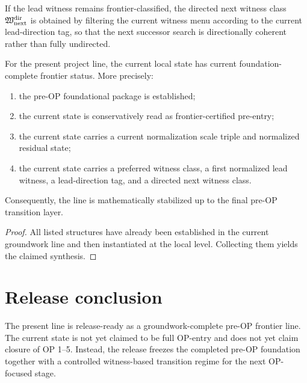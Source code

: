 \begin{definition}\label{def:directed-next-witness-class}
If the lead witness remains frontier-classified, the directed next witness class $\mathfrak{W}^{\mathrm{dir}}_{\mathrm{next}}$ is obtained by filtering the current witness menu according to the current lead-direction tag, so that the next successor search is directionally coherent rather than fully undirected.
\end{definition}

\begin{theorem}\label{thm:current-state-synthesis-theorem}
For the present project line, the current local state has current foundation-complete frontier status. More precisely:
\begin{enumerate}[leftmargin=2em]
 \item the pre-OP foundational package is established;
 \item the current state is conservatively read as frontier-certified pre-entry;
 \item the current state carries a current normalization scale triple and normalized residual state;
 \item the current state carries a preferred witness class, a first normalized lead witness, a lead-direction tag, and a directed next witness class.
\end{enumerate}
Consequently, the line is mathematically stabilized up to the final pre-OP transition layer.
\end{theorem}

\begin{proof}
All listed structures have already been established in the current groundwork line and then instantiated at the local level. Collecting them yields the claimed synthesis.
\end{proof}

\section{Release conclusion}
\begin{corollary}\label{cor:groundwork-complete-frontier-release-reading}
The present line is release-ready as a groundwork-complete pre-OP frontier line. The current state is not yet claimed to be full OP-entry and does not yet claim closure of OP 1--5. Instead, the release freezes the completed pre-OP foundation together with a controlled witness-based transition regime for the next OP-focused stage.
\end{corollary}

